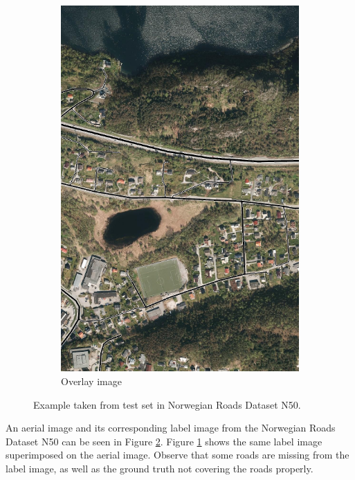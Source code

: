 \begin{figure}
\begin{subfigure}{0.32\textwidth}
\includegraphics[width=\linewidth]{figs/datasets/Norwegian_roads_overlay_example2.png}
\caption{Overlay image} \label{fig:norwegian_roads_example_overlay}
\end{subfigure}
\hspace*{\fill} %
\caption[Example from Norwegian Roads Dataset N50]{Example taken from test set in Norwegian Roads Dataset N50.} \label{fig:norwegian_roads_example}
\end{figure}

An aerial image and its corresponding label image from the Norwegian Roads Dataset N50 can be seen in Figure \ref{fig:norwegian_roads_example}. Figure \ref{fig:norwegian_roads_example_overlay} shows the same label image superimposed on the aerial image. Observe that some roads are missing from the label image, as well as the ground truth not covering the roads properly. \\
